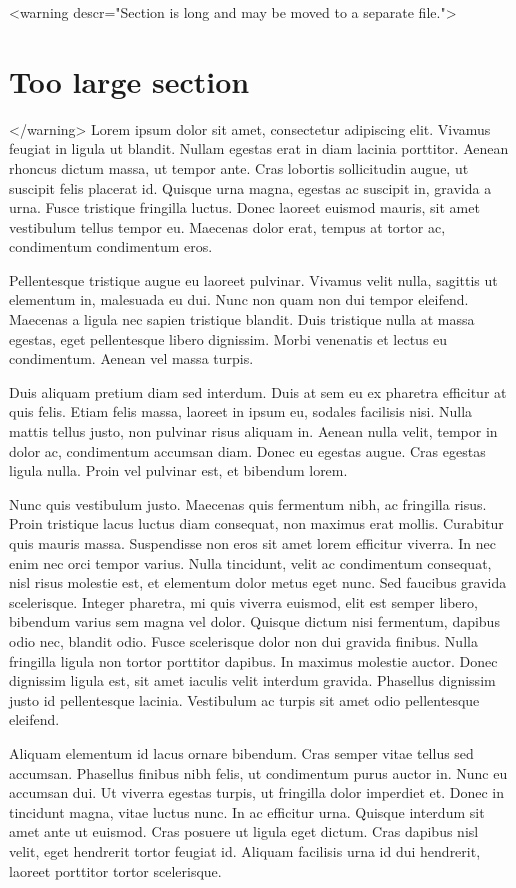 \documentclass[11pt]{article}
\begin{document}
    <warning descr="Section is long and may be moved to a separate file.">\section{Too large section}</warning>
    Lorem ipsum dolor sit amet, consectetur adipiscing elit. Vivamus feugiat in ligula ut blandit. Nullam egestas erat in diam lacinia porttitor. Aenean rhoncus dictum massa, ut tempor ante. Cras lobortis sollicitudin augue, ut suscipit felis placerat id. Quisque urna magna, egestas ac suscipit in, gravida a urna. Fusce tristique fringilla luctus. Donec laoreet euismod mauris, sit amet vestibulum tellus tempor eu. Maecenas dolor erat, tempus at tortor ac, condimentum condimentum eros.

    Pellentesque tristique augue eu laoreet pulvinar. Vivamus velit nulla, sagittis ut elementum in, malesuada eu dui. Nunc non quam non dui tempor eleifend. Maecenas a ligula nec sapien tristique blandit. Duis tristique nulla at massa egestas, eget pellentesque libero dignissim. Morbi venenatis et lectus eu condimentum. Aenean vel massa turpis.

    Duis aliquam pretium diam sed interdum. Duis at sem eu ex pharetra efficitur at quis felis. Etiam felis massa, laoreet in ipsum eu, sodales facilisis nisi. Nulla mattis tellus justo, non pulvinar risus aliquam in. Aenean nulla velit, tempor in dolor ac, condimentum accumsan diam. Donec eu egestas augue. Cras egestas ligula nulla. Proin vel pulvinar est, et bibendum lorem.

    Nunc quis vestibulum justo. Maecenas quis fermentum nibh, ac fringilla risus. Proin tristique lacus luctus diam consequat, non maximus erat mollis. Curabitur quis mauris massa. Suspendisse non eros sit amet lorem efficitur viverra. In nec enim nec orci tempor varius. Nulla tincidunt, velit ac condimentum consequat, nisl risus molestie est, et elementum dolor metus eget nunc. Sed faucibus gravida scelerisque. Integer pharetra, mi quis viverra euismod, elit est semper libero, bibendum varius sem magna vel dolor. Quisque dictum nisi fermentum, dapibus odio nec, blandit odio. Fusce scelerisque dolor non dui gravida finibus. Nulla fringilla ligula non tortor porttitor dapibus. In maximus molestie auctor. Donec dignissim ligula est, sit amet iaculis velit interdum gravida. Phasellus dignissim justo id pellentesque lacinia. Vestibulum ac turpis sit amet odio pellentesque eleifend.

    Aliquam elementum id lacus ornare bibendum. Cras semper vitae tellus sed accumsan. Phasellus finibus nibh felis, ut condimentum purus auctor in. Nunc eu accumsan dui. Ut viverra egestas turpis, ut fringilla dolor imperdiet et. Donec in tincidunt magna, vitae luctus nunc. In ac efficitur urna. Quisque interdum sit amet ante ut euismod. Cras posuere ut ligula eget dictum. Cras dapibus nisl velit, eget hendrerit tortor feugiat id. Aliquam facilisis urna id dui hendrerit, laoreet porttitor tortor scelerisque.
\end{document}
